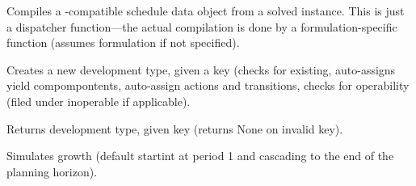 \documentclass[letterpaper,10pt,english]{sphinxmanual}
\begin{document}
\begin{fulllineitems}
\begin{fulllineitems}
\end{fulllineitems}


\begin{fulllineitems}
\label{\detokenize{forest:forest.ForestModel.compile_schedule}}
Compiles a -compatible schedule data object from a solved  instance. This is just a dispatcher function—the actual compilation is done by a formulation-specific function (assumes  formulation if not specified).

\end{fulllineitems}


\begin{fulllineitems}
\label{\detokenize{forest:forest.ForestModel.create_dtype_fromkey}}
Creates a new development type, given a key (checks for existing, auto-assigns yield compompontents, 
auto-assign actions and transitions, checks for operability (filed under inoperable if applicable).

\end{fulllineitems}


\begin{fulllineitems}
\label{\detokenize{forest:forest.ForestModel.dt}}
Returns development type, given key (returns None on invalid key).

\end{fulllineitems}


\begin{fulllineitems}
\label{\detokenize{forest:forest.ForestModel.grow}}
Simulates growth (default startint at period 1 and cascading to the end of the planning horizon).

\end{fulllineitems}



\end{fulllineitems}
\end{document}
